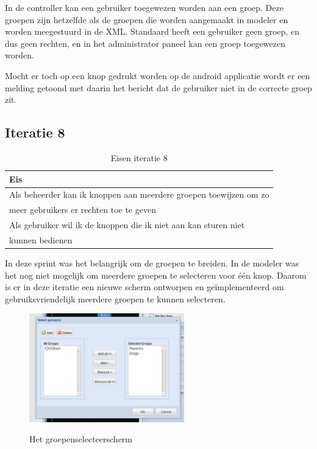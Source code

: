 \documentclass[]{article}
\begin{document}
In de controller kan een gebruiker toegewezen worden aan een groep. Deze groepen
zijn hetzelfde als de groepen die worden aangemaakt in modeler en worden
meegestuurd in de XML. Standaard heeft een gebruiker geen groep, en dus geen
rechten, en in het administrator paneel kan een groep toegewezen worden.

Mocht er toch op een knop gedrukt worden op de android applicatie wordt er een
melding getoond met daarin het bericht dat de gebruiker niet in de correcte
groep zit. 

\subsection{Iteratie 8}

\begin{table}[htpb]
  \caption{Eisen iteratie 8}
  \begin{center}
    \begin{tabular}{|| l ||}\hline
        Eis                                                              \\\hline\hline
        Als beheerder kan ik knoppen aan meerdere groepen toewijzen om zo\\
        meer gebruikers er rechten toe te geven                          \\\hline
        Als gebruiker wil ik de knoppen die ik niet aan kan sturen niet  \\ 
        kunnen bedienen                                                  \\\hline
    \end{tabular}
  \end{center}
\end{table}

In deze sprint was het belangrijk om de groepen te breiden. In de modeler was
het nog niet mogelijk om meerdere groepen te selecteren voor \'e\'en knop.
Daarom is er in deze iteratie een nieuwe scherm ontworpen en ge\"implementeerd
om gebruiksvriendelijk meerdere groepen te kunnen selecteren.

\begin{figure}[h!]
  \centering
    \includegraphics[width=0.6\textwidth,keepaspectratio]{groupselect.pdf}
  \label{fig:groupselect}
  \caption{Het groepenselecteerscherm}
\end{figure}
\end{document}
